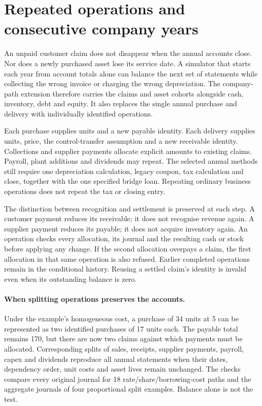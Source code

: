 \section{Repeated operations and consecutive company years}
\label{sec:company-operation-paths}

An unpaid customer claim does not disappear when the annual accounts close.
Nor does a newly purchased asset lose its service date. A simulator that starts
each year from account totals alone can balance the next set of statements
while collecting the wrong invoice or charging the wrong depreciation. The
company-path extension therefore carries the claims and asset cohorts alongside
cash, inventory, debt and equity. It also replaces the single annual purchase
and delivery with individually identified operations.

Each purchase supplies units and a new payable identity. Each delivery supplies
units, price, the control-transfer assumption and a new receivable identity.
Collections and supplier payments allocate explicit amounts to existing claims.
Payroll, plant additions and dividends may repeat. The selected annual methods
still require one depreciation calculation, legacy coupon, tax calculation and
close, together with the one specified bridge loan. Repeating ordinary business
operations does not repeat the tax or closing entry.

The distinction between recognition and settlement is preserved at each step.
A customer payment reduces its receivable; it does not recognise revenue again.
A supplier payment reduces its payable; it does not acquire inventory again.
An operation checks every allocation, its journal and the resulting cash or
stock before applying any change. If the second allocation overpays a claim,
the first allocation in that same operation is also refused. Earlier completed
operations remain in the conditional history. Reusing a settled claim's identity
is invalid even when its outstanding balance is zero.

\paragraph{When splitting operations preserves the accounts.}
Under the example's homogeneous cost, a purchase of 34 units at 5 can be
represented as two identified purchases of 17 units each. The payable total
remains 170, but there are now two claims against which payments must be
allocated. Corresponding splits of sales, receipts, supplier payments, payroll,
capex and dividends reproduce all annual statements when their dates, dependency
order, unit costs and asset lives remain unchanged. The checks compare every
original journal for 18 rate/share/borrowing-cost paths and the aggregate
journals of four proportional split examples. Balance alone is not the test.

